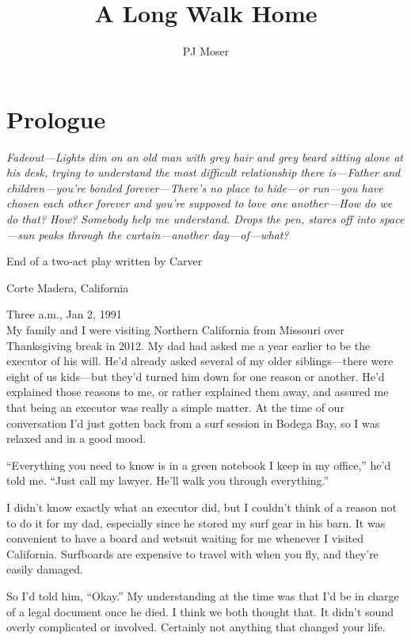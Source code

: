 \documentclass[12pt]{book}
\author{PJ Moser}
\title{A Long Walk Home}
\date{}
\begin{document}
\frontmatter
\maketitle
\tableofcontents

\chapter*{Prologue} 
\noindent\textit{Fadeout---Lights dim on an old man with grey hair and grey beard sitting alone at his desk, trying to understand the most difficult relationship there is---Father and children---you're bonded forever---There's no place to hide---or run---you have chosen each other forever and you're supposed to love one another---How do we do that? How? Somebody help me understand. Drops the pen, stares off into space---sun peaks through the curtain---another day---of---what?}

\noindent End of a two-act play written by Carver

\noindent Corte Madera, California

\noindent Three a.m., Jan 2, 1991\\

My family and I were visiting Northern California from Missouri over Thanksgiving break in 2012. My dad had asked me a year earlier to be the executor of his will. He'd already asked several of my older siblings---there were eight of us kids---but they'd turned him down for one reason or another. He'd explained those reasons to me, or rather explained them away, and assured me that being an executor was really a simple matter. At the time of our conversation I'd just gotten back from a surf session in Bodega Bay, so I was relaxed and in a good mood.

``Everything you need to know is in a green notebook I keep in my office,'' he'd told me. ``Just call my lawyer. He'll walk you through everything.''

I didn't know exactly what an executor did, but I couldn't think of a reason not to do it for my dad, especially since he stored my surf gear in his barn. It was convenient to have a board and wetsuit waiting for me whenever I visited California. Surfboards are expensive to travel with when you fly, and they're easily damaged.

So I'd told him, ``Okay.'' My understanding at the time was that I'd be in charge of a legal document once he died. I think we both thought that. It didn't sound overly complicated or involved. Certainly not anything that changed your life.
\end{document}
